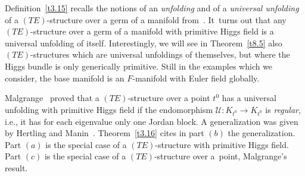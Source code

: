 \documentclass[pdftex]{sigma}%
\numberwithin{equation}{section}
\numberwithin{figure}{section}
\newcommand{\UU}{{\mathcal U}}
\begin{document}
Definition~\ref{t3.15} recalls the notions of an
{\it unfolding} and of a {\it universal unfolding}
of a $(TE)$-structure over a germ of a manifold
from~\cite[Definition 2.3]{HM04}. It~turns out that any $(TE)$-structure over a germ of a manifold
with primitive Higgs field is a universal unfolding of itself.
Interestingly, we will see in Theorem~\ref{t8.5}
also $(TE)$-structures which are universal unfoldings
of themselves, but where the Higgs bundle is only
generically primitive. Still in the examples which
we consider, the base manifold is an $F$-manifold with
Euler field globally.

Malgrange~\cite{Ma86} proved that a $(TE)$-structure
over a point $t^0$ has a universal unfolding
with primitive Higgs field if the endomorphism
$\UU\colon K_{t^0}\to K_{t^0}$ is {\it regular}, i.e.,
it has for each eigenvalue only one Jordan block.
A generalization was given by Hertling and Manin~\cite[Theorem~2.5]{HM04}.
Theorem~\ref{t3.16} cites in part $(b)$
the generalization.
Part $(a)$ is the special case of a $(TE)$-structure
with primitive Higgs field.
Part $(c)$ is the special case of a $(TE)$-structure
over a~point, Malgrange's result.
\end{document}
